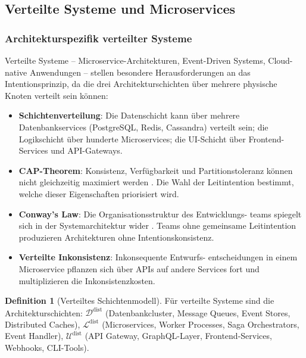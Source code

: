 ﻿\documentclass[a4paper,12pt]{article}
\theoremstyle{definition}
\newtheorem{definition}{Definition}
\begin{document}
\subsection{Verteilte Systeme und Microservices}

\subsubsection{Architekturspezifik verteilter Systeme}

Verteilte Systeme -- Microservice-Architekturen, Event-Driven Systems,
Cloud-native Anwendungen -- stellen besondere Herausforderungen an das
Intentionsprinzip, da die drei Architekturschichten über mehrere physische
Knoten verteilt sein können:

\begin{itemize}
    \item \textbf{Schichtenverteilung}: Die Datenschicht kann über mehrere
          Datenbankservices (PostgreSQL, Redis, Cassandra) verteilt sein;
          die Logikschicht über hunderte Microservices; die UI-Schicht über
          Frontend-Services und API-Gateways.
    \item \textbf{CAP-Theorem}: Konsistenz, Verfügbarkeit und
          Partitionstoleranz können nicht gleichzeitig maximiert werden
          \cite{brewer2000cap}. Die Wahl der Leitintention bestimmt, welche
          dieser Eigenschaften priorisiert wird.
    \item \textbf{Conway's Law}: Die Organisationsstruktur des Entwicklungs-
          teams spiegelt sich in der Systemarchitektur wider \cite{conway1968}.
          Teams ohne gemeinsame Leitintention produzieren Architekturen ohne
          Intentionskonsistenz.
    \item \textbf{Verteilte Inkonsistenz}: Inkonsequente Entwurfs-
          entscheidungen in einem Microservice pflanzen sich über APIs auf
          andere Services fort und multiplizieren die Inkonsistenzkosten.
\end{itemize}

\begin{definition}[Verteiltes Schichtenmodell]
Für verteilte Systeme sind die Architekturschichten:
$\mathcal{D}^{\text{dist}}$ (Datenbankcluster, Message Queues, Event
Stores, Distributed Caches),
$\mathcal{L}^{\text{dist}}$ (Microservices, Worker Processes, Saga
Orchestrators, Event Handler),
$\mathcal{U}^{\text{dist}}$ (API Gateway, GraphQL-Layer, Frontend-Services,
Webhooks, CLI-Tools).
\end{definition}
\end{document}
